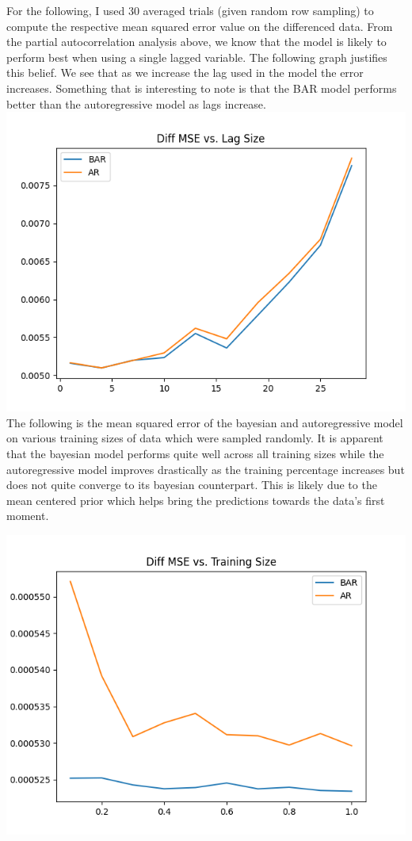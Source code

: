 \documentclass{article}
\begin{document}
For the following, I used 30 averaged trials (given random row sampling) to compute the respective mean squared error value on the differenced data. From the partial autocorrelation analysis above, we know that the model is likely to perform best when using a single lagged variable. The following graph justifies this belief. We see that as we increase the lag used in the model the error increases. Something that is interesting to note is that the BAR model performs better than the autoregressive model as lags increase.
\\
\includegraphics[width=\textwidth]{../output/AMZN_lag_size.png}
\\
The following is the mean squared error of the bayesian and autoregressive model on various training sizes of data which were sampled randomly. It is apparent that the bayesian model performs quite well across all training sizes while the autoregressive model improves drastically as the training percentage increases but does not quite converge to its bayesian counterpart. This is likely due to the mean centered prior which helps bring the predictions towards the data's first moment.

\includegraphics[width=\textwidth]{../output/AMZN_training_size.png}
\end{document}
